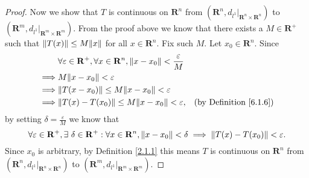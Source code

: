 \begin{proof}
    Now we show that \(T\) is continuous on \(\mathbf{R}^n\) from \((\mathbf{R}^n, d_{l^1}|_{\mathbf{R}^n \times \mathbf{R}^n})\) to \((\mathbf{R}^m, d_{l^1}|_{\mathbf{R}^m \times \mathbf{R}^m})\).
    From the proof above we know that there exists a \(M \in \mathbf{R}^+\) such that \(\norm*{T(x)} \leq M \norm*{x}\) for all \(x \in \mathbf{R}^n\).
    Fix such \(M\).
    Let \(x_0 \in \mathbf{R}^n\).
    Since
    \begin{align*}
                 & \forall \varepsilon \in \mathbf{R}^+, \forall x \in \mathbf{R}^n, \norm*{x - x_0} < \frac{\varepsilon}{M}                                      \\
        \implies & M \norm*{x - x_0} < \varepsilon                                                                                                                \\
        \implies & \norm*{T(x - x_0)} \leq M \norm*{x - x_0} < \varepsilon                                                                                        \\
        \implies & \norm*{T(x) - T(x_0)} \leq M \norm*{x - x_0} < \varepsilon,                                               & \text{(by Definition \ref{6.1.6})}
    \end{align*}
    by setting \(\delta = \frac{\varepsilon}{M}\) we know that
    \[
        \forall \varepsilon \in \mathbf{R}^+, \exists\ \delta \in \mathbf{R}^+ : \forall x \in \mathbf{R}^n, \norm*{x - x_0} < \delta \implies \norm*{T(x) - T(x_0)} < \varepsilon.
    \]
    Since \(x_0\) is arbitrary, by Definition \ref{2.1.1} this means \(T\) is continuous on \(\mathbf{R}^n\) from \((\mathbf{R}^n, d_{l^1}|_{\mathbf{R}^n \times \mathbf{R}^n})\) to \((\mathbf{R}^m, d_{l^1}|_{\mathbf{R}^m \times \mathbf{R}^m})\).
\end{proof}